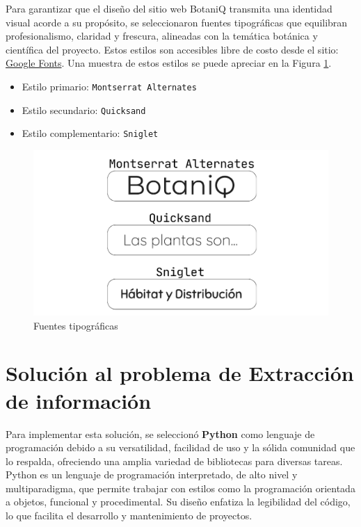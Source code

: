Para garantizar que el diseño del sitio web BotaniQ transmita una identidad visual acorde a su 
propósito, se seleccionaron fuentes tipográficas que equilibran profesionalismo, claridad y frescura, 
alineadas con la temática botánica y científica del proyecto. Estos estilos son accesibles
libre de costo desde el sitio: \href{https://fonts.google.com/}{Google Fonts}. 
Una muestra de estos estilos se puede apreciar en la Figura \ref{fig:fonts}.

\begin{itemize}
    \item Estilo primario: \texttt{Montserrat Alternates}
    \item Estilo secundario: \texttt{Quicksand}
    \item Estilo complementario: \texttt{Sniglet}
\end{itemize}


\begin{figure}[ht!]
    \centering
    \includegraphics[width=1\textwidth]{Images/fonts.png}
    \caption{Fuentes tipográficas}
    \label{fig:fonts}
\end{figure}



\section{Solución al problema de Extracción de información}
Para implementar esta solución, se seleccionó \textbf{Python} como lenguaje de programación 
debido a su versatilidad, facilidad de uso y la sólida comunidad que lo respalda, ofreciendo 
una amplia variedad de bibliotecas para diversas tareas. Python es un lenguaje de 
programación interpretado, de alto nivel y multiparadigma, que permite trabajar con estilos 
como la programación orientada a objetos, funcional y procedimental. Su diseño enfatiza la 
legibilidad del código, lo que facilita el desarrollo y mantenimiento de proyectos.

